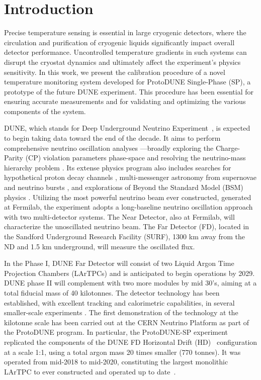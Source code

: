 \section{Introduction}
\label{sec:introduction}

\noindent Precise temperature sensing is essential in large cryogenic detectors, where the circulation and purification of cryogenic liquids significantly impact overall detector performance. Uncontrolled temperature gradients in such systems can disrupt the cryostat dynamics and ultimately affect the experiment's physics sensitivity. In this work, we present the calibration procedure of a novel temperature monitoring system developed for ProtoDUNE Single-Phase (SP), a prototype of the future DUNE experiment. This procedure has been essential for ensuring accurate measurements and for validating and optimizing the various components of the system.

DUNE, which stands for Deep Underground Neutrino Experiment~\cite{dune_tdr1}, is expected to begin taking data toward the end of the decade. It aims to perform comprehensive neutrino oscillation analyses ---broadly exploring the Charge-Parity (CP) violation parameters phase-space and resolving the neutrino-mass hierarchy problem \cite{bib:dune_osc}. Its extense physics program also includes searches for hypothetical proton decay channels \cite{bib:dune_tdr2}, multi-messenger astronomy from supernovae and neutrino bursts \cite{bib:dune_supernova}, and explorations of Beyond the Standard Model (BSM) physics \cite{bib:dune_bsm}. Utilizing the most powerful neutrino beam ever constructed, generated at Fermilab, the experiment adopts a long-baseline neutrino oscillation approach with two multi-detector systems. The Near Detector, also at Fermilab, will characterize the unoscillated neutrino beam. The Far Detector (FD), located in the Sandford Underground Research Facility (SURF), 1300 km away from the ND and 1.5 km underground, will measure the oscillated flux.

In the Phase I, DUNE Far Detector will consist of two Liquid Argon Time Projection Chambers (LArTPCs) and is anticipated to begin operations by 2029. DUNE phase II will complement with two more modules by mid 30's, aiming at a total fiducial mass of 40 kilotonnes. The detector technology has been established, with excellent tracking and calorimetric capabilities, in several smaller-scale experiments \cite{icarus,microboone}. The first demonstration of the technology at the kilotonne scale has been carried out at the CERN Neutrino Platform as part of the ProtoDUNE program. In particular, the ProtoDUNE-SP experiment~\cite{pdsp_tdr} replicated the components of the DUNE FD Horizontal Drift (HD)~\cite{dune_tdr4} configuration at a scale 1:1, using a total argon mass 20 times smaller (770 tonnes). It was operated from mid-2018 to mid-2020, constituting the largest monolithic LArTPC to ever constructed and operated up to date~\cite{pdsp_1,pdsp_2}.

